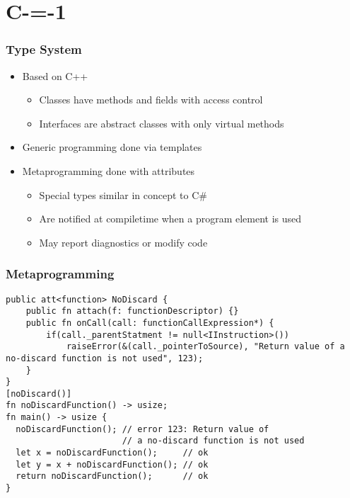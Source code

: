 \section{C-=-1}

\begin{frame}
    \frametitle{Type System}

    \begin{itemize}
        \item Based on C++\begin{itemize}
            \item Classes have methods and fields with access control
            \item Interfaces are abstract classes with only virtual methods
        \end{itemize}
        \item Generic programming done via templates
        \item Metaprogramming done with attributes\begin{itemize}
            \item Special types similar in concept to C\#
            \item Are notified at compiletime when a program element is used
            \item May report diagnostics or modify code
        \end{itemize}
    \end{itemize}

\end{frame}

\begin{frame}[fragile]
    \frametitle{Metaprogramming}

    \begin{lstlisting}
public att<function> NoDiscard {
    public fn attach(f: functionDescriptor) {}
    public fn onCall(call: functionCallExpression*) {
        if(call._parentStatment != null<IInstruction>())
            raiseError(&(call._pointerToSource), "Return value of a no-discard function is not used", 123);
    }
}
[noDiscard()]
fn noDiscardFunction() -> usize;
fn main() -> usize {
  noDiscardFunction(); // error 123: Return value of
                       // a no-discard function is not used
  let x = noDiscardFunction();     // ok
  let y = x + noDiscardFunction(); // ok
  return noDiscardFunction();      // ok
}
    \end{lstlisting}

\end{frame}


